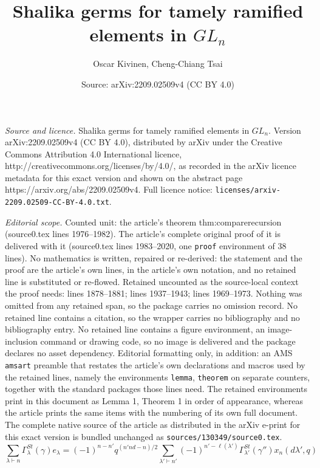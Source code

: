 \documentclass[10pt,a4paper]{amsart}
\title{Shalika germs for tamely ramified elements in $GL_n$}
\author{Oscar Kivinen, Cheng-Chiang Tsai}
\date{Source: arXiv:2209.02509v4 (CC BY 4.0)}
\begin{document}
\maketitle

\noindent\emph{Source and licence.} Shalika germs for tamely ramified elements in $GL_n$. Version arXiv:2209.02509v4 (CC BY 4.0), distributed by arXiv under the Creative Commons Attribution 4.0 International licence, http://creativecommons.org/licenses/by/4.0/, as recorded in the arXiv licence metadata for this exact version and shown on the abstract page https://arxiv.org/abs/2209.02509v4. Full licence notice: \texttt{licenses/arxiv-2209.02509-CC-BY-4.0.txt}.\par\smallskip

\noindent\textit{Editorial scope.} Counted unit: the article's theorem thm:comparerecursion (source0.tex lines 1976--1982). The article's complete original proof of it is delivered with it (source0.tex lines 1983--2020, one \texttt{proof} environment of 38 lines). No mathematics is written, repaired or re-derived: the statement and the proof are the article's own lines, in the article's own notation, and no retained line is substituted or re-flowed.  Retained uncounted as the source-local context the proof needs: lines 1878--1881; lines 1937--1943; lines 1969--1973.  Nothing was omitted from any retained span, so the package carries no omission record.  No retained line contains a citation, so the wrapper carries no bibliography and no bibliography entry.  No retained line contains a figure environment, an image-inclusion command or drawing code, so no image is delivered and the package declares no asset dependency.  Editorial formatting only, in addition: an AMS \texttt{amsart} preamble that restates the article's own declarations and macros used by the retained lines, namely the environments \texttt{lemma}, \texttt{theorem} on separate counters, together with the standard packages those lines need.  The retained environments print in this document as Lemma 1, Theorem 1 in order of appearance, whereas the article prints the same items with the numbering of its own full document.  The complete native source of the article as distributed in the arXiv e-print for this exact version is bundled unchanged as \texttt{sources/130349/source0.tex}.
\begin{equation}
\label{eq:recursion-hside}
\sum_{\lambda\vdash n} \Gamma^{St}_\lambda(\gamma)e_\lambda=(-1)^{n-n'}q^{(n'n d-n)/2}\sum_{\lambda'\vdash n'} (-1)^{n'-\ell(\lambda')}\Gamma^{St}_{\lambda'}(\gamma'')x_n(d\lambda',q)
\end{equation}
\end{document}
